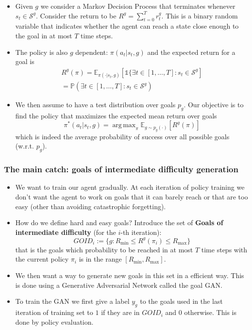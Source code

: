\documentclass{beamer}
\theoremstyle{plain}
\theoremstyle{definition}
\theoremstyle{remark}
\newcommand{\Pro}{\mathds{P}}
\newcommand{\E}{\mathds{E}}
\DeclareMathOperator*{\argmax}{arg\,max}
\begin{document}
\begin{frame}
	\begin{itemize}
		\item Given $g$ we consider a Markov Decision Process that terminates whenever $s_t\in \mathcal{S}^g$. Consider the return to be $R^g = \sum_{t=0}^{T}{r_t^g}$. This is a binary random variable that indicates whether the agent can reach a state close enough to the goal in at most $T$ time steps.
		\item The policy is also $g$ dependent: $\pi(a_t|s_t,g)$ and the expected return for a goal is
			\begin{align*}
				R^g(\pi) = \E_{\pi(\cdot|s_t,g)}\left[\mathds{1}\{\exists t\in[1,\ldots, T]: s_t\in\mathcal{S}^g\right]\\
				= \Pro\left(\exists t\in[1,\ldots, T]: s_t\in\mathcal{S}^g\right)
			\end{align*}
		\item We then assume to have a test distribution over goals $p_g$. Our objective is to find the policy that maximizes the expected mean return over goals
			\begin{equation*}
				\pi^{*}(a_t|s_t,g) = \argmax_{\pi}\E_{g\sim p_g(\cdot)}[R^g(\pi)]
			\end{equation*}
			which is indeed the average probability of success over all possible goals (w.r.t. $p_g$).
	\end{itemize}
\end{frame}

\begin{frame}
	\frametitle{The main catch: goals of intermediate difficulty generation}
	\begin{itemize}
		\item We want to train our agent gradually. At each iteration of policy training we don't want the agent to work on goals that it can barely reach or that are too easy (other than avoiding catastrophic forgetting).
  		\item How do we define hard and easy goals? Introduce the set of \textbf{Goals of intermediate difficulty} (for the $i$-th iteration):
			\begin{equation*}
				GOID_i := \{g: R_{\text{min}}\leq R^g(\pi_i)\leq R_{\text{max}}\}
			\end{equation*}
			that is the goals which probability to be reached in at most $T$ time steps with the current policy $\pi_i$ is in the range $[R_{\text{min}},R_{\text{max}}]$.
		\item We then want a way to generate new goals in this set in a efficient way. This is done using a Generative Adversarial Network called the goal GAN.
  		\item To train the GAN we first give a label $y_g$ to the goals used in the last iteration of training set to $1$ if they are in $GOID_i$ and $0$ otherwise. This is done by policy evaluation.
	\end{itemize}
\end{frame}
\end{document}
